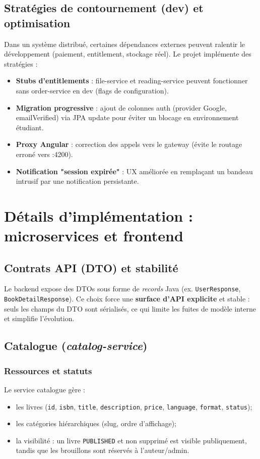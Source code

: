 \documentclass[12pt,a4paper]{report}
\begin{document}
\section{Stratégies de contournement (dev) et optimisation}
Dans un système distribué, certaines dépendances externes peuvent ralentir le développement (paiement, entitlement, stockage réel). Le projet implémente des stratégies :
\begin{itemize}
  \item \textbf{Stubs d'entitlements} : file-service et reading-service peuvent fonctionner sans order-service en dev (flags de configuration).
  \item \textbf{Migration progressive} : ajout de colonnes auth (provider Google, emailVerified) via JPA update pour éviter un blocage en environnement étudiant.
  \item \textbf{Proxy Angular} : correction des appels vers le gateway (évite le routage erroné vers :4200).
  \item \textbf{Notification "session expirée"} : UX améliorée en remplaçant un bandeau intrusif par une notification persistante.
\end{itemize}

\chapter{Détails d'implémentation : microservices et frontend}

\section{Contrats API (DTO) et stabilité}
Le backend expose des DTOs sous forme de \textit{records} Java (ex. \texttt{UserResponse}, \texttt{BookDetailResponse}). Ce choix force une \textbf{surface d'API explicite} et stable : seuls les champs du DTO sont sérialisés, ce qui limite les fuites de modèle interne et simplifie l'évolution.\par

\section{Catalogue (\textit{catalog-service})}
\subsection{Ressources et statuts}
Le service catalogue gère :
\begin{itemize}
  \item les livres (\texttt{id}, \texttt{isbn}, \texttt{title}, \texttt{description}, \texttt{price}, \texttt{language}, \texttt{format}, \texttt{status});
  \item les catégories hiérarchiques (slug, ordre d'affichage);
  \item la visibilité : un livre \texttt{PUBLISHED} et non supprimé est visible publiquement, tandis que les brouillons sont réservés à l'auteur/admin.\par
\end{itemize}
\end{document}
